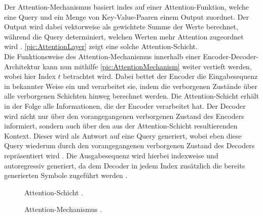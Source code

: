 \noindent
Der Attention-Mechanismus basiert indes auf einer Attention-Funktion, welche eine Query und ein Menge von Key-Value-Paaren einem Output zuordnet. Der Output wird dabei vektorweise als gewichtete Summe der Werte berechnet, während die Query determiniert, welchen Werten mehr Attention zugeordnet wird \cite{VAS17}. \autoref{pic:AttentionLayer} zeigt eine solche Attention-Schicht.\\

\noindent
Die Funktionsweise des Attention-Mechanismus innerhalb einer Encoder-Decoder-Architektur kann nun mithilfe \autoref{pic:AttentionMechanism} weiter vertieft werden, wobei hier Index $t$ betrachtet wird. Dabei bettet der Encoder die Eingabesequenz in bekannter Weise ein und verarbeitet sie, indem die verborgenen Zustände über alle verborgenen Schichten hinweg berechnet werden. Die Attention-Schicht erhält in der Folge alle Informationen, die der Encoder verarbeitet hat. Der Decoder wird nicht nur über den vorangegangenen verborgenen Zustand des Encoders informiert, sondern auch über den aus der Attention-Schicht resultierenden Kontext. Dieser wird als Antwort auf eine Query generiert, wobei eben diese Query wiederum durch den vorangegangenen verborgenen Zustand des Decoders repräsentiert wird \cite[S.~394]{ZHA20}. Die Ausgabesequenz wird hierbei indexweise und autoregressiv generiert, da dem Decoder in jedem Index zusätzlich die bereits generierten Symbole zugeführt werden \cite{VAS17}.\\

\begin{figure}[h!]
  \centering
  \caption{Attention-Schicht \cite[S.~390]{ZHA20}.}
  \label{pic:AttentionLayer}
\end{figure}

\begin{figure}[h!]
  \centering
  \caption{Attention-Mechanismus \cite[S.~394]{ZHA20}.}
  \label{pic:AttentionMechanism}
\end{figure}

